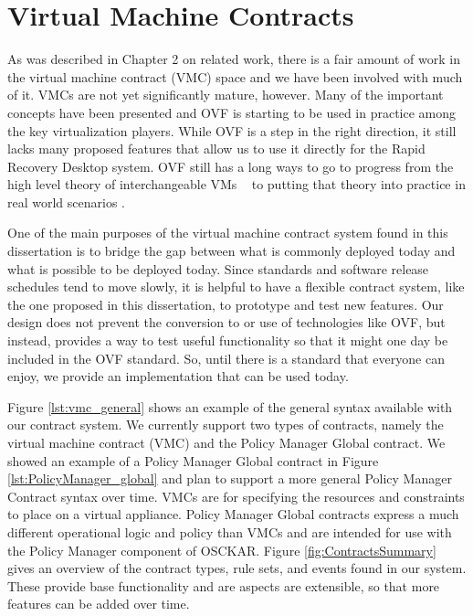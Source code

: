 \section{Virtual Machine Contracts}

As was described in Chapter 2 on related work, there is a fair amount of work in the virtual machine contract (VMC) space and we have been involved with much of it. VMCs are not yet significantly mature, however. Many of the important concepts have been presented \cite{virtual_machine_contract_ICAC09} and OVF is starting to be used in practice among the key virtualization players. While OVF is a step in the right direction, it still lacks many proposed features that allow us to use it directly for the Rapid Recovery Desktop system. OVF still has a long ways to go to progress from the high level theory of interchangeable VMs ~\cite{dmtf_newsletter, vmware_ovf_website, citrix_ovf_article, rhev_announce_2010} to putting that theory into practice in real world scenarios \cite {ovf_vmware_to_kvm_2010,fedora_virtAppliances, kensho_ovf_vmware_article}. 

One of the main purposes of the virtual machine contract system found in this dissertation is to bridge the gap between what is commonly deployed today and what is possible to be deployed today. Since standards and software release schedules tend to move slowly, it is helpful to have a flexible contract system, like the one proposed in this dissertation, to prototype and test new features. Our design does not prevent the conversion to or use of technologies like OVF, but instead, provides a way to test useful functionality so that it might one day be included in the OVF standard. So, until there is a standard that everyone can enjoy, we provide an implementation that can be used today. 

Figure \ref{lst:vmc_general} shows an example of the general syntax available with our contract system. We currently support two types of contracts, namely the virtual machine contract (VMC) and the Policy Manager Global contract. We showed an example of a Policy Manager Global contract in Figure \ref{lst:PolicyManager_global} and plan to support a more general Policy Manager Contract syntax over time.  VMCs are for specifying the resources and constraints to place on a virtual appliance. Policy Manager Global contracts express a much different operational logic and policy than VMCs and are intended for use with the Policy Manager component of OSCKAR. Figure \ref{fig:ContractsSummary} gives an overview of the contract types, rule sets, and events found in our system. These provide base functionality and are aspects are extensible, so that more features can be added over time.

